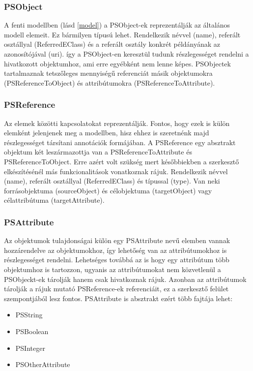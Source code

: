 \subsubsection{PSObject}
A fenti modellben (lásd \autoref{model}) a PSObject-ek reprezentálják az általános modell elemeit. Ez bármilyen típusú lehet. Rendelkezik névvel (name), referált osztállyal (ReferredEClass) és a referált osztály konkrét példányának az azonosítójával (uri). így a PSObject-en keresztül tudunk részlegességet rendelni a hivatkozott objektumhoz, ami erre egyébként nem lenne képes. PSObjectek tartalmaznak tetszőleges mennyiségű referenciát másik objektumokra (PSReferenceToObject) és attribútumokra (PSReferenceToAttribute).

\subsubsection{PSReference}
 Az elemek közötti kapcsolatokat reprezentálják. Fontos, hogy ezek is külön elemként jelenjenek meg a modellben, hisz ehhez is szeretnénk majd részlegességet társítani annotációk formájában. A PSReference egy absztrakt objektum két leszármazottja van a  PSReferenceToAttribute és PSReferenceToObject. Erre azért volt szükség mert későbbiekben a szerkesztő elkészítésénél más funkcionalitások vonatkoznak rájuk. Rendelkezik névvel (name), referált osztállyal (ReferredEClass) és típussal (type). Van neki forrásobjektuma (sourceObject) és célobjektuma (targetObject) vagy célattribútuma (targetAttribute).

\subsubsection{PSAttribute}
Az objektumok tulajdonságai külön egy PSAttribute nevű elemben vannak hozzárendelve az objektumokhoz, így lehetőség van az attribútumokhoz is részlegességet rendelni. Lehetséges továbbá az is hogy egy attribútum több objektumhoz is tartozzon, ugyanis az attribútumokat nem közvetlenül a PSObjeckt-ek tárolják hanem csak hivatkoznak rájuk. Azonban az attribútumok tárolják a rájuk mutató PSReference-ek referenciáit, ez a szerkesztő felület szempontjából lesz fontos. PSAttribute is absztrakt ezért több fajtája lehet:

\begin{itemize}  
	\item PSString
	\item PSBoolean
	\item PSInteger
	\item PSOtherAttribute 
\end{itemize}



